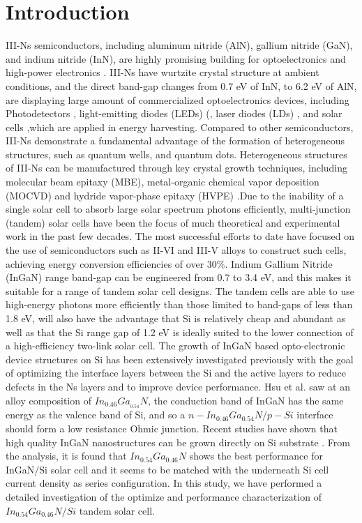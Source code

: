 \documentclass[preprint,12pt]{elsarticle}
\begin{document}
\section{Introduction} \label{sec:Int}
III-Ns semiconductors, including aluminum nitride (AlN), gallium nitride (GaN), and indium nitride (InN), are highly promising building for optoelectronics and high-power electronics \cite{strite1992gan}. III-Ns have wurtzite crystal structure at ambient conditions, and the direct band-gap changes from 0.7 eV of InN, to 6.2 eV of AlN, are displaying large amount of commercialized optoelectronics devices, including Photodetectors \cite{pernot2000solar,chen1997schottky,munoz1997photoconductor}, light-emitting diodes (LEDs) (\cite{nakamura1993high,funato2006blue,iso2007high}, laser diodes (LDs) \cite{nakamura1998continuous}, and solar cells \cite{neufeld2008high,jani2007design,jiang2017enhanced},which are applied in energy harvesting. Compared to other semiconductors, III-Ns demonstrate a fundamental advantage of the formation of heterogeneous structures, such as quantum wells, and  quantum dots. Heterogeneous structures of III-Ns can be manufactured through key crystal growth techniques, including molecular beam epitaxy (MBE), metal-organic chemical vapor deposition (MOCVD) and hydride vapor-phase epitaxy (HVPE) \cite{jain2000iii,yoshida1982properties,li2007influence}.Due to the inability of a single solar cell to absorb large solar spectrum photons efficiently, multi-junction (tandem) solar cells have been the focus of much theoretical and experimental work in the past few decades. The most successful efforts to date have focused on the use of semiconductors such as II-VI and III-V alloys to construct such cells, achieving energy conversion efficiencies of over 30\%. Indium Gallium Nitride (InGaN) range band-gap can be engineered from 0.7 to 3.4 eV, and this makes it suitable for a range of tandem solar cell designs. The tandem cells are able to use high-energy photons more efficiently than those limited to band-gaps of less than 1.8 eV, will also have the advantage that Si is relatively cheap and abundant as well as that the Si range gap of 1.2 eV is ideally suited to the lower connection of a high-efficiency two-link solar cell. The growth of InGaN based opto-electronic device structures on Si has been extensively investigated previously with the goal of optimizing the interface layers between the Si and the active layers to reduce defects in the Ns layers and to improve device performance. Hsu et al.\cite{hsu2008modeling} saw at an alloy composition of $In_{0.46}Ga_{_{0.54}}N$, the conduction band of InGaN has the same energy as the valence band of Si, and so a $n-In_{0.46}Ga_{0.54}N/p-Si$ interface should form a low resistance Ohmic junction. Recent studies have shown that high quality InGaN nanostructures can be grown directly on Si substrate \cite{arafin2013review, wang2019in0}. From the analysis, it is found that $In_{0.54}Ga_{0.46}N$ shows the best performance for InGaN/Si solar cell and it seems to be matched with the underneath Si cell current density as series configuration. In this study, we have performed a detailed investigation of the optimize and performance characterization of $In_{0.54}Ga_{0.46}N/Si$ tandem solar cell.
\end{document}
